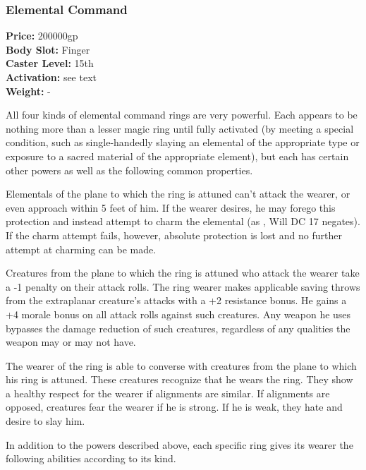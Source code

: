\subsubsection{Elemental Command}
\label{Item:ElementalCommand}
   \textbf{Price:} 200000gp
\\ \textbf{Body Slot:} Finger
\\ \textbf{Caster Level:} 15th
\\ \textbf{Activation:} see text
\\ \textbf{Weight:} -

All four kinds of elemental command rings are very powerful. 
Each appears to be nothing more than a lesser magic ring until fully activated (by meeting a special condition, such as single-handedly slaying an elemental of the appropriate type or exposure to a sacred material of the appropriate element), but each has certain other powers as well as the following common properties.

Elementals of the plane to which the ring is attuned can't attack the wearer, or even approach within 5 feet of him. If the wearer desires, he may forego this protection and instead attempt to charm the elemental (as , Will DC 17 negates). If the charm attempt fails, however, absolute protection is lost and no further attempt at charming can be made.

Creatures from the plane to which the ring is attuned who attack the wearer take a -1 penalty on their attack rolls. 
The ring wearer makes applicable saving throws from the extraplanar creature's attacks with a +2 resistance bonus. 
He gains a +4 morale bonus on all attack rolls against such creatures. 
Any weapon he uses bypasses the damage reduction of such creatures, regardless of any qualities the weapon may or may not have.

The wearer of the ring is able to converse with creatures from the plane to which his ring is attuned. 
These creatures recognize that he wears the ring. 
They show a healthy respect for the wearer if alignments are similar. 
If alignments are opposed, creatures fear the wearer if he is strong. If he is weak, they hate and desire to slay him.

In addition to the powers described above, each specific ring gives its wearer the following abilities according to its kind.

